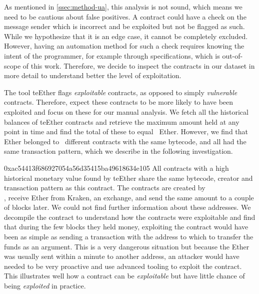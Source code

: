  As mentioned in \autoref{ssec:method-ua}, this analysis is not sound, which means we need to be cautious about false positives.
A contract could have a check on the message sender which is incorrect and be exploited but not be flagged as such.
While we hypothesize that it is an edge case, it cannot be completely excluded.
However, having an automation method for such a check requires knowing the intent of the programmer, for example through specifications, which is out-of-scope of this work.
Therefore, we decide to inspect the contracts in our dataset in more detail to understand better the level of exploitation.

The tool teEther flags \emph{exploitable} contracts, as opposed to simply \emph{vulnerable} contracts.
Therefore, expect these contracts to be more likely to have been exploited and focus on these for our manual analysis.
We fetch all the historical balances of teEther contracts and retrieve the maximum amount held at any point in time and find the total of these to equal~ Ether.
However, we find that~ Ether belonged to~ different contracts with the same bytecode, and all had the same transaction pattern, which we describe in the following investigation.

\begin{investigation}{0xac54413f686927054a56d35415ba49618634e105}
  All contracts with a high historical monetary value found by teEther share the same bytecode, creator and transaction pattern as this contract.
  The contracts are created by\\ , receive Ether from Kraken, an exchange, and send the same amount to  a couple of blocks later.
  We could not find further information about these addresses.
  We decompile the contract to understand how the contracts were exploitable and find that during the few blocks they held money, exploiting the contract would have been as simple as sending a transaction with the address to which to transfer the funds as an argument.
  This is a very dangerous situation but because the Ether was usually sent within a minute to another address, an attacker would have needed to be very proactive and use advanced tooling to exploit the contract.
  This illustrates well how a contract can be \emph{exploitable} but have little chance of being \emph{exploited} in practice.
\end{investigation}

